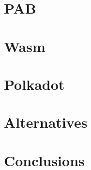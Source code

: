 \thispagestyle{empty} %
\cleardoublepage

\thispagestyle{empty}

\clearpage{\pagestyle{plain}\cleardoublepage}


\clearpage{\pagestyle{plain}\cleardoublepage}
\tableofcontents %

\clearpage{\pagestyle{plain}\cleardoublepage} %

\clearpage{\pagestyle{plain}\cleardoublepage} %
\chapter{PAB} %
\label{chapter:pab} %


\clearpage{\pagestyle{plain}\cleardoublepage}
\chapter{Wasm}
\label{chapter:wasm}


\clearpage{\pagestyle{plain}\cleardoublepage}
\chapter{Polkadot}
\label{chapter:polkadot}


\clearpage{\pagestyle{plain}\cleardoublepage}
\chapter{Alternatives}
\label{chapter:alternatives}


\clearpage{\pagestyle{plain}\cleardoublepage}
\chapter{Conclusions}
\label{chapter:conclusions}


\clearpage{\pagestyle{plain}\cleardoublepage}




